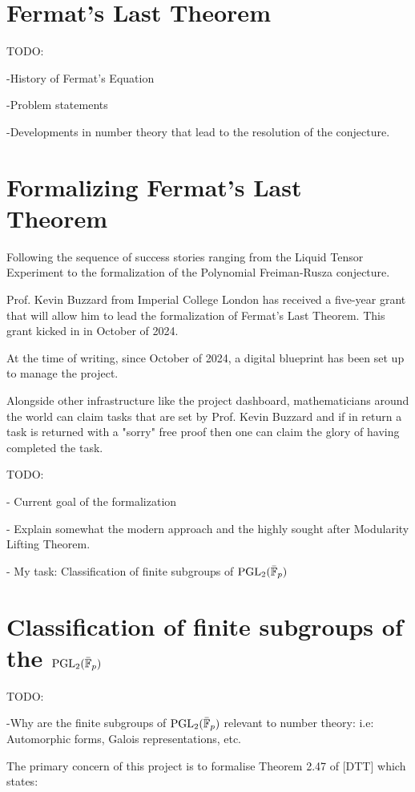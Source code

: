 \section{Fermat's Last Theorem}

TODO:

-History of Fermat's Equation

-Problem statements

-Developments in number theory that lead to the resolution of the conjecture.


\section{Formalizing Fermat's Last Theorem}

Following the sequence of success stories ranging from the Liquid Tensor Experiment to the formalization of the Polynomial Freiman-Rusza conjecture. 

Prof. Kevin Buzzard from Imperial College London has received a five-year grant that will allow him to lead the formalization of Fermat's Last Theorem. This grant kicked in in October of 2024. 

At the time of writing, since October of 2024, a digital blueprint has been set up to manage the project.

Alongside other infrastructure like the project dashboard, mathematicians around the world can claim tasks that are set by Prof. Kevin Buzzard and if in return a task is returned with a "sorry" free proof then one can claim the glory of having completed the task.

TODO:

- Current goal of the formalization

- Explain somewhat the modern approach and the highly sought after Modularity Lifting Theorem.

- My task: Classification of finite subgroups of $\operatorname{PGL}_2(\bar{\mathbb{F}}_p)$



\section{Classification of finite subgroups of the $\operatorname{PGL}_2(\bar{\mathbb{F}}_p)$}

TODO:

-Why are the finite subgroups of  $\operatorname{PGL}_2(\bar{\mathbb{F}}_p)$ relevant to number theory: i.e: Automorphic forms, Galois representations, etc.


The primary concern of this project is to formalise Theorem 2.47 of [DTT] which states:


